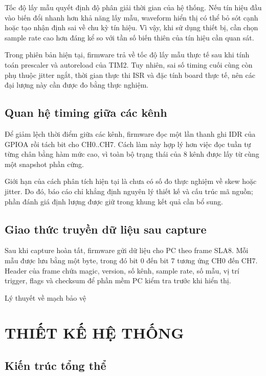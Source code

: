 Tốc độ lấy mẫu quyết định độ phân giải thời gian của hệ thống. Nếu tín hiệu đầu vào biến đổi nhanh hơn khả năng lấy mẫu, waveform hiển thị có thể bỏ sót cạnh hoặc tạo nhận định sai về chu kỳ tín hiệu. Vì vậy, khi sử dụng thiết bị, cần chọn sample rate cao hơn đáng kể so với tần số biến thiên của tín hiệu cần quan sát.

Trong phiên bản hiện tại, firmware trả về tốc độ lấy mẫu thực tế sau khi tính toán prescaler và autoreload của TIM2. Tuy nhiên, sai số timing cuối cùng còn phụ thuộc jitter ngắt, thời gian thực thi ISR và đặc tính board thực tế, nên các đại lượng này cần được đo bằng thực nghiệm.

\section{Quan hệ timing giữa các kênh}\label{quan-hux1ec7-timing-giux1eefa-cuxe1c-kuxeanh}

Để giảm lệch thời điểm giữa các kênh, firmware đọc một lần thanh ghi IDR của GPIOA rồi tách bit cho CH0..CH7. Cách làm này hợp lý hơn việc đọc tuần tự từng chân bằng hàm mức cao, vì toàn bộ trạng thái của 8 kênh được lấy từ cùng một snapshot phần cứng.

Giới hạn của cách phân tích hiện tại là chưa có số đo thực nghiệm về skew hoặc jitter. Do đó, báo cáo chỉ khẳng định nguyên lý thiết kế và cấu trúc mã nguồn; phần đánh giá định lượng được giữ trong khung kết quả cần bổ sung.

\section{Giao thức truyền dữ liệu sau capture}\label{giao-thux1ee9c-truyux1ec1n-dux1eef-liux1ec7u-sau-capture}

Sau khi capture hoàn tất, firmware gửi dữ liệu cho PC theo frame SLA8. Mỗi mẫu được lưu bằng một byte, trong đó bit 0 đến bit 7 tương ứng CH0 đến CH7. Header của frame chứa magic, version, số kênh, sample rate, số mẫu, vị trí trigger, flags và checksum để phần mềm PC kiểm tra trước khi hiển thị.

Lý thuyết về mạch bảo vệ

\chapter{THIẾT KẾ HỆ THỐNG}\label{thiux1ebft-kux1ebf-hux1ec7-thux1ed1ng}

\section{Kiến trúc tổng thể}\label{kiux1ebfn-truxfac-tux1ed5ng-thux1ec3}

